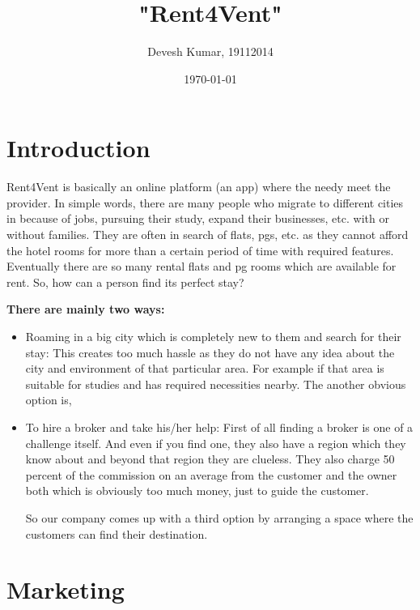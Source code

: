 \documentclass{article}
\title{\textbf{"Rent4Vent"}}
\author{Devesh Kumar, 19112014}
\date{\today}
\begin{document}
\maketitle

\section{Introduction}

\setlength{\parskip}{1em}

\large Rent4Vent is basically an online platform (an app) where the needy meet the provider. In simple words, there are many people who migrate to different cities in because of jobs, pursuing their study, expand their businesses, etc. with or without families. They are often in search of flats, pgs, etc. as they cannot afford the hotel rooms for more than a certain period of time with required features. Eventually there are so many rental flats and pg rooms which are available for rent. So, how can a person find its perfect stay? 

\setlength{\parskip}{1em}


\large{\textbf{There are mainly two ways:  }}
\begin{itemize}
    \item 	Roaming in a big city which is completely new to them and search for their stay: This creates too much hassle as they do not have any idea about the city and environment of that particular area. For example if that area is suitable for studies and has required necessities nearby. The another obvious option is,
    \item	To hire a broker and take his/her help: First of all finding a broker is one of a challenge itself. And even if you find one, they also have a region which they know about and beyond that region they are clueless. They also charge 50 percent of the commission on an average from the customer and the owner both which is obviously too much money, just to guide the customer.
    
\setlength{\parskip}{1em}

\large So our company comes up with a third option by arranging a space where the customers can find their destination. 
    
\end{itemize}

\section{Marketing}
\end{document}
